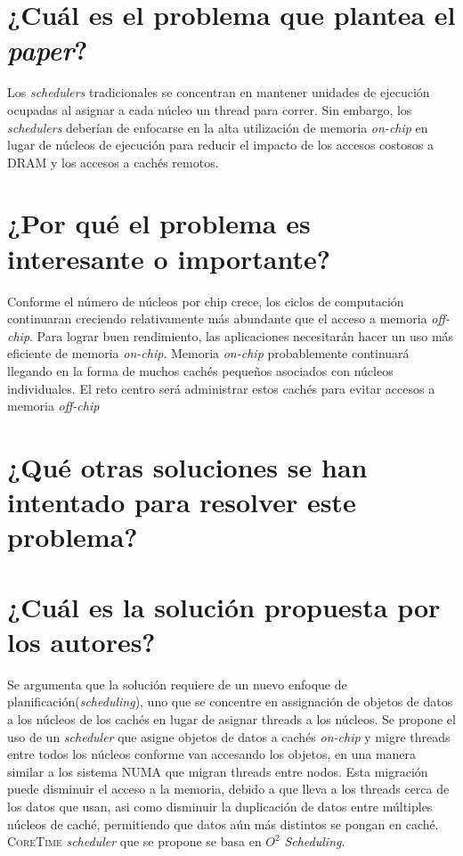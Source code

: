 \section{¿Cuál es el problema que plantea el \textit{paper}?}
Los \emph{schedulers} tradicionales se concentran en mantener unidades de ejecución ocupadas al asignar a cada núcleo un thread para correr. Sin embargo, los \emph{schedulers} deberían de enfocarse en la alta utilización de memoria \emph{on-chip} en lugar de núcleos de ejecución para reducir el impacto de los accesos costosos a DRAM y los accesos a cachés remotos.  

\section{¿Por qué el problema es interesante o importante?}
Conforme el número de núcleos por chip crece, los ciclos de computación continuaran creciendo relativamente más abundante que el acceso a memoria \emph{off-chip}. Para lograr buen rendimiento, las aplicaciones necesitarán hacer un uso más eficiente de memoria \emph{on-chip}. Memoria \emph{on-chip} probablemente continuará llegando en la forma de muchos cachés pequeños asociados con núcleos individuales. El reto centro será administrar estos cachés para evitar accesos a memoria \emph{off-chip}

\section{¿Qué otras soluciones se han intentado para resolver este problema?}
     
\section{¿Cuál es la solución propuesta por los autores?}
Se argumenta que la solución requiere de un nuevo enfoque de planificación(\emph{scheduling}), uno que se concentre en assignación de objetos de datos a los núcleos de los cachés en lugar de asignar threads a los núcleos. Se propone el uso de un \emph{scheduler} que asigne objetos de datos a cachés \emph{on-chip} y migre threads entre todos los núcleos conforme van accesando los objetos, en una manera similar a los sistema NUMA que migran threads entre nodos. Esta migración puede disminuir el acceso a la memoria, debido a que lleva a los threads cerca de los datos que usan, asi como disminuir la duplicación de datos entre múltiples núcleos de caché, permitiendo que datos aún más distintos se pongan en caché. \textsc{CoreTime} \emph{scheduler} que se propone se basa en $O^2$ \emph{Scheduling}.

